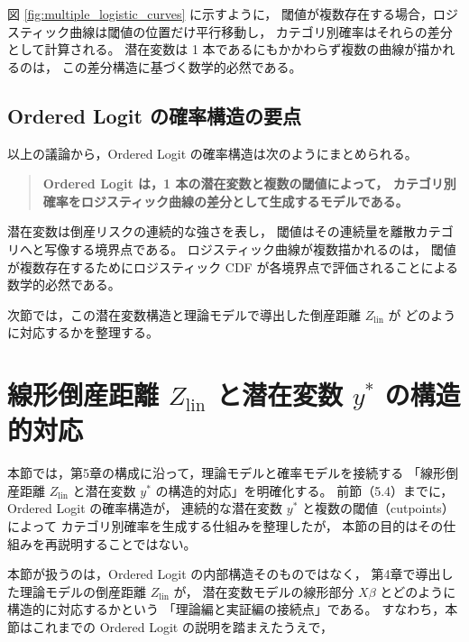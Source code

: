図 \ref{fig:multiple_logistic_curves} に示すように，
閾値が複数存在する場合，ロジスティック曲線は閾値の位置だけ平行移動し，
カテゴリ別確率はそれらの差分として計算される。
潜在変数は 1 本であるにもかかわらず複数の曲線が描かれるのは，
この差分構造に基づく数学的必然である。


\subsection{Ordered Logit の確率構造の要点}

以上の議論から，Ordered Logit の確率構造は次のようにまとめられる。

\begin{quote}
\textbf{
Ordered Logit は，1 本の潜在変数と複数の閾値によって，
カテゴリ別確率をロジスティック曲線の差分として生成するモデルである。
}
\end{quote}

潜在変数は倒産リスクの連続的な強さを表し，
閾値はその連続量を離散カテゴリへと写像する境界点である。
ロジスティック曲線が複数描かれるのは，
閾値が複数存在するためにロジスティック CDF が各境界点で評価されることによる
数学的必然である。


次節では，この潜在変数構造と理論モデルで導出した倒産距離 $Z_{\text{lin}}$ が
どのように対応するかを整理する。




\section{線形倒産距離 $Z_{\text{lin}}$ と潜在変数 $y^*$ の構造的対応}
\label{sec:zlin_y_mapping}

本節では，第5章の構成に沿って，理論モデルと確率モデルを接続する
「線形倒産距離 $Z_{\text{lin}}$ と潜在変数 $y^*$ の構造的対応」を明確化する。
前節（5.4）までに，Ordered Logit の確率構造が，
連続的な潜在変数 $y^*$ と複数の閾値（cutpoints）によって
カテゴリ別確率を生成する仕組みを整理したが，
本節の目的はその仕組みを再説明することではない。

本節が扱うのは，Ordered Logit の内部構造そのものではなく，
第4章で導出した理論モデルの倒産距離 $Z_{\text{lin}}$ が，
潜在変数モデルの線形部分 $X\beta$ とどのように構造的に対応するかという
「理論編と実証編の接続点」である。
すなわち，本節はこれまでの Ordered Logit の説明を踏まえたうえで，

